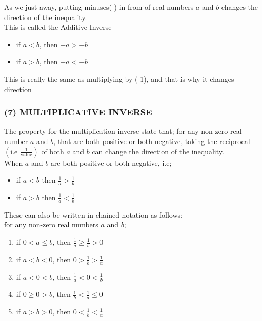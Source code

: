 \documentclass[12pt]{report}
\newcommand{\spn}[1]{\\[#1cm]}
\newcommand{\NI}{\noindent}
\begin{document}
	\NI As we just away, putting minuses(-) in from of real numbers $a$ and $b$ changes the direction of the inequality.\spn{0.3}
	This is called the Additive Inverse
	\begin{itemize}
		\item if $a<b$, then $-a > -b$
		\item if $a>b$, then $-a < -b$
	\end{itemize}
	
	\NI This is really the same as multiplying by (-1), and that is why it changes direction
	
	\subsubsection{(7) MULTIPLICATIVE INVERSE}
	The property for the multiplication inverse state that; for any non-zero real number $a$ and $b$, that are both positive or both negative, taking the reciprocal $\left(\text{i.e } \frac{1}{\text{value}}\right)$ of both $a$ and $b$ can change the direction of the inequality.\\
	
	\NI When $a$ and $b$ are both positive or both negative, i.e;
	\begin{itemize}
		\item if $a<b$ then $\frac{1}{a} > \frac{1}{b}$
		\item if $a>b$ then $\frac{1}{a} < \frac{1}{b}$
	\end{itemize}
	
	\NI These can also be written in chained notation as follows:\\
	for any non-zero real numbers $a$ and $b$;
	\begin{enumerate}
		\item if $0<a \leq b$, then $\frac{1}{a} \geq \frac{1}{b} > 0$
		\item if $a<b<0$, then $0 > \frac{1}{b} > \frac{1}{a}$
		\item if $a<0<b$, then $\frac{1}{a}<0<\frac{1}{b}$
		\item if $0\geq0>b$, then $\frac{1}{b} < \frac{1}{a} \leq 0$
		\item if $a>b>0$, then $0 < \frac{1}{b} < \frac{1}{a}$
	\end{enumerate}	
	
\end{document}
